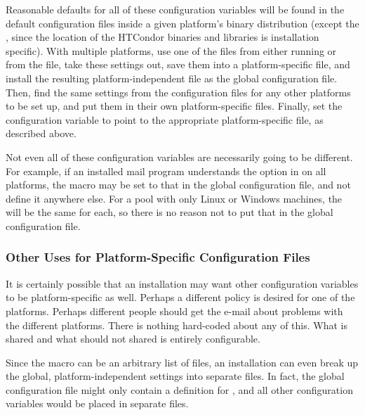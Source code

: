 Reasonable defaults for all of these configuration variables
will be found in the
default configuration files inside a given platform's binary distribution
(except the , since 
the location of the HTCondor binaries and libraries is installation specific).
With multiple platforms,
use one of the  files from
either running  or from the
 file,
take these settings out,
save them into a platform-specific file,
and install the resulting platform-independent file as the global
configuration file.
Then,
find the same settings from the configuration files for any other platforms
to be set up, and put them in their own platform-specific files.
Finally, set the  configuration variable
to point to
the appropriate platform-specific file, as described above.

Not even all of these configuration variables are necessarily
going to be different.
For example, if an installed mail program understands the
 option in  on all platforms,
the  macro may be set to that in the global configuration
file, and not define it anywhere else.
For a pool with only Linux or Windows machines,
the  will be the same for each, so there is no
reason not to put that in the global configuration file.

\subsubsection{\label{sec:Other-Uses-for-Platform-Files}Other Uses for
Platform-Specific Configuration Files} 

It is certainly possible that an installation may want other 
configuration variables to be platform-specific as well.
Perhaps a different policy is desired for
one of the platforms.
Perhaps different people should get the
e-mail about problems with the different platforms.
There is nothing hard-coded about any of this.
What is shared and
what should not shared is entirely configurable.

Since the  macro can be an arbitrary
list of files, an installation can even break up the global,
platform-independent settings into separate files.
In fact, the global configuration file might
only contain a definition for , and all
other configuration variables would be placed in separate files.  

